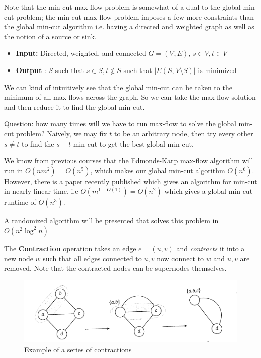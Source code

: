 \documentclass[../notes.tex]{subfiles}
\begin{document}
\begin{blockquote}

Note that the min-cut-max-flow problem is somewhat of a dual to the global min-cut problem; the min-cut-max-flow problem imposes a few more constraints than the global min-cut algorithm i.e. having a directed and weighted graph as well as the notion of a source or sink.

\begin{itemize}
  \item \textbf{Input: }  Directed, weighted, and connected $ G = (V,E) $, $ s \in V, t \in V $
  \item \textbf{Output}  : $ S $ such that $ s \in S, t \notin S $ such that $  |E(S, V\setminus S ) |  $ is minimized
\end{itemize}
  
\end{blockquote}

We can kind of intuitively see that the global min-cut can be taken to the minimum of all max-flows across the graph.
So we can take the max-flow solution and then reduce it to find the global min cut.

Question: how many times will we have to run max-flow to solve the global min-cut problem? 
Naively, we may fix $ t $ to be an arbitrary node, then try every other $ s \neq t $ to find the $  s-t $ min-cut to get the best global min-cut.

We know from previous courses that the Edmonds-Karp max-flow algorithm will run in $ O(nm^2) = O(n^5) $, which makes our global min-cut algorithm $ O(n^6) $.
However, there is a paper recently published which gives an algorithm for min-cut in nearly linear time, i.e $ O(m^{1-O(1)}) = O(n^2) $  which gives a global min-cut runtime of $ O(n^3) $.

A randomized algorithm will be presented that solves this problem in $ O(n^2 \log^2 n) $


\begin{definition}
  The \textbf{Contraction} operation takes an edge $ e = (u,v) $ and \textit{contracts} it into a new node $ w $ such that all edges connected to $ u,v $ now connect to $ w $ and $ u,v $ are removed. Note that the contracted nodes can be supernodes themselves.

  \begin{figure}[H]
    \centering
    \includegraphics[width=0.8\linewidth]{img/image_2023-01-12-16-47-50.png}
    \caption{Example of a series of contractions}
  \end{figure}

\end{definition}
\end{document}
